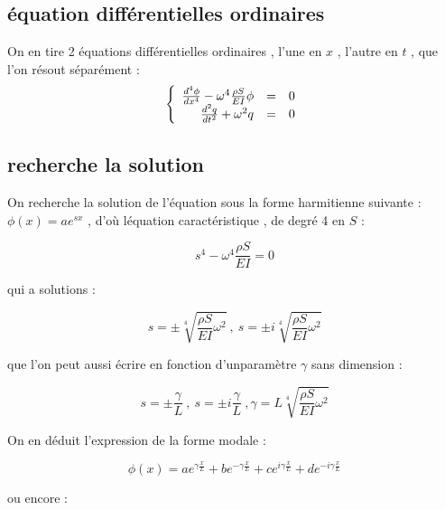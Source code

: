 \documentclass[a4paper,10pt]{report} %
\begin{document}
\subsection{équation différentielles ordinaires}

On en tire 2 équations différentielles ordinaires , l'une en $x$ , l'autre en $t$ , que l'on résout séparément :
\begin{equation}
	\left\{
    \begin{array}{r c l }
        \frac{d^4\phi}{dx^4}-\omega^4\frac{\rho S}{EI}\phi&=&0\\
        \frac{d^2q}{dt^2}+\omega^2 q&=&0
    \end{array}
    \right.
\end{equation}
\subsection{recherche la solution}

On recherche la solution de l'équation sous la forme harmitienne suivante :
   $\phi (x)=ae^{sx}$ , d'où léquation caractéristique , de degré 4 en $S$ :

\begin{equation}
	s^4-\omega^4\frac{\rho S}{EI}=0
	\label{equation5}
\end{equation}

qui a solutions :

\begin{equation}
    s=\pm \sqrt[4]{\frac{\rho S}{EI}{\omega^2}}\ ,\ s=\pm i\sqrt[4]{\frac{\rho S}{EI}{\omega^2}}
    \label{equation6}
\end{equation}

que l'on peut aussi écrire en fonction d'unparamètre $\gamma$ sans dimension :

\begin{equation}
    s=\pm\frac{\gamma}{L}\ ,\ s=\pm i\frac{\gamma}{L}\ , \gamma=L\sqrt[4]{\frac{\rho S}{EI}{\omega^2}}
    \label{equation7}
\end{equation}


On en déduit l'expression de la forme modale :

\begin{equation}
    \phi (x)=ae^{\gamma\frac{x}{L}}+be^{-\gamma\frac{x}{L}}+ce^{i\gamma\frac{x}{L}}+de^{-i\gamma\frac{x}{L}} 
    \label{equation8}
\end{equation}

ou encore :
\end{document}
